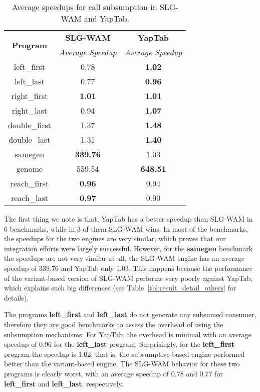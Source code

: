 \begin{table}[ht]
\centering
  \begin{tabular}{ccc}
   \hline
    \hline
    \multirow{2}{*}{\textbf{Program}} & \textbf{SLG-WAM} & \textbf{YapTab} \\
    & \textit{\small{Average Speedup}} & \textit{\small{Average Speedup}} \\
   \hline
   \hline
left\_first & 0.78 & \textbf{1.02} \\
left\_last & 0.77  & \textbf{0.96} \\
right\_first & \textbf{1.01} & \textbf{1.01} \\
right\_last & 0.94 & \textbf{1.07} \\
double\_first & 1.37 & \textbf{1.48} \\
double\_last & 1.31 & \textbf{1.40} \\
samegen & \textbf{339.76} & 1.03 \\
genome & 559.54 & \textbf{648.51} \\
reach\_first  & \textbf{0.96} & 0.94 \\
reach\_last  & \textbf{0.97} & 0.90 \\
\hline
\hline
\end{tabular}
\caption{Average speedups for call subsumption in SLG-WAM and YapTab.}
\label{tbl:results_overview}
\end{table}

The first thing we note is that,  YapTab has a better speedup than SLG-WAM in 6 benchmarks, while in 3 of
them SLG-WAM wins. In most of the benchmarks, the speedups for the two engines are very similar, which proves
that our integration efforts were  largely successful. However, for the \textbf{samegen} benchmark the
speedups are not very similar at all, the SLG-WAM engine has an average speedup of 339.76
and YapTab only 1.03. This happens because the performance of the variant-based version of SLG-WAM
performs very poorly against YapTab, which explains such big differences (see Table~\ref{tbl:result_detail_others}
for details).

The programs \textbf{left\_first} and \textbf{left\_last} do not generate any subsumed consumer,
therefore they are good benchmarks to assess the overhead of using the subsumption mechanisms. For YapTab,
the overhead is minimal with an average speedup of 0.96 for the \textbf{left\_last} program. Surprisingly, for the
\textbf{left\_first} program the speedup is 1.02, that is, the subsumptive-based engine performed better
than the variant-based engine. The SLG-WAM behavior for these two programs is clearly worst, with an average
speedup of 0.78 and 0.77 for \textbf{left\_first} and \textbf{left\_last}, respectively.


